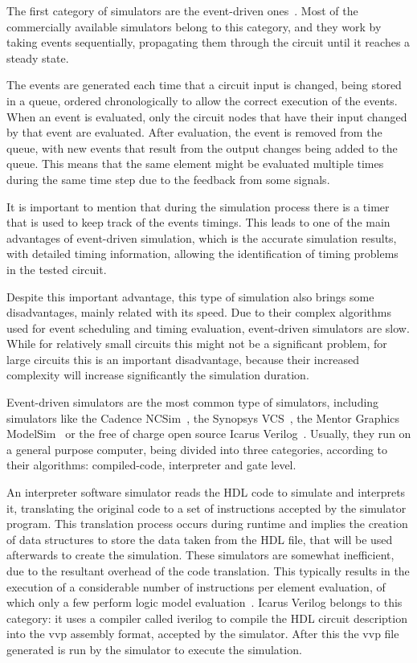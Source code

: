 \documentclass[conference]{IEEEtran}
\begin{document}
The first category of simulators are the event-driven
ones~\cite{tan:vhstas,gunes:survey,palnitkar:verilog}. Most of the commercially available 
simulators belong to this category, and they work by taking events sequentially, 
propagating them through the circuit until it reaches a steady state.

The events are generated each time that a circuit input is changed, being stored
in a queue, ordered chronologically to allow the correct execution of the
events. When an event is evaluated, only the circuit nodes that have their input
changed by that event are evaluated. After evaluation, the event is removed from
the queue, with new events that result from the output changes being added to
the queue. This means that the same element might be evaluated multiple times
during the same time step due to the feedback from some signals.

It is important to mention that during the simulation process there is a timer
that is used to keep track of the events timings. This leads to one of the main
advantages of event-driven simulation, which is the accurate simulation results,
with detailed timing information, allowing the identification of timing problems
in the tested circuit.

Despite this important advantage, this type of simulation also brings some
disadvantages, mainly related with its speed. Due to their complex algorithms
used for event scheduling and timing evaluation, event-driven simulators are
slow. While for relatively small circuits this might not be a significant
problem, for large circuits this is an important disadvantage, because their
increased complexity will increase significantly the simulation duration.

Event-driven simulators are the most common type of simulators, including
simulators like the Cadence NCSim~\cite{cadence:ncsim}, the Synopsys
VCS~\cite{synopsys:vcs}, the Mentor Graphics ModelSim~\cite{mentor:modelsim} or
the free of charge open source Icarus Verilog~\cite{icarus:verilog}. Usually,
they run on a general purpose computer, being divided into three categories,
according to their algorithms: compiled-code, interpreter and gate level.

An interpreter software simulator reads the \ac{HDL} code to simulate and interprets
it, translating the original code to a set of instructions accepted by the
simulator program. This translation process occurs during runtime and implies
the creation of data structures to store the data taken from the \ac{HDL} file, that
will be used afterwards to create the simulation. These simulators are somewhat
inefficient, due to the resultant overhead of the code translation. This
typically results in the execution of a considerable number of instructions per
element evaluation, of which only a few perform logic model
evaluation~\cite{lewis:compiled}. Icarus Verilog belongs to this category: it uses a 
compiler called iverilog to compile the \ac{HDL} circuit description into the vvp 
assembly format, accepted by the simulator. After this the vvp file generated is run by 
the simulator to execute the simulation.
\end{document}
